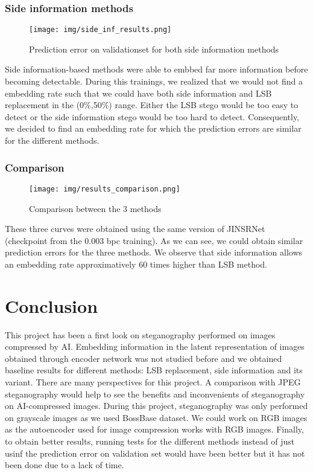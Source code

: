 \documentclass[12pt]{article}
\begin{document}
\subsubsection{Side information methods}
\begin{figure}[H]
    \texttt{[image: img/side\_inf\_results.png]}
    \caption[Side information methods results]{Prediction error on validationset for both side information methods}
    \label{fig:side_inf_results}
\end{figure}
Side information-based methods were able to embbed far more information before becoming detectable. During this trainings, we realized that we would not find a embedding rate such that we could have both side information and LSB replacement in the (0\%,50\%) range. Either the LSB stego would be too easy to detect or the side information stego would be too hard to detect. Consequently, we decided to find an embedding rate for which the prediction errors are similar for the different methods.

\subsubsection{Comparison}
\begin{figure}[H]
    \texttt{[image: img/results\_comparison.png]}
    \caption[Comparative results]{Comparison between the 3 methods}
    \label{fig:results_comparison}
\end{figure}
These three curves were obtained using the same version of JINSRNet (checkpoint from the 0.003 bpc training). As we can see, we could obtain similar prediction errors for the three methods. We observe that side information allows an embedding rate approximatively 60 times higher than LSB method.

\section{Conclusion}
This project has been a first look on steganography performed on images compressed by AI. Embedding information in the latent representation of images obtained through encoder network was not studied before and we obtained baseline results for different methods: LSB replacement, side information and its variant. There are many perspectives for this project. A comparison with JPEG steganography  would help to see the benefits and inconvenients of steganography on AI-compressed images. During this project, steganography was only performed on grayscale images as we used BossBase dataset. We could work on RGB images as the autoencoder used for image compression works with RGB images. Finally, to obtain better results, running tests for the different methods instead of just usinf the prediction error on validation set would have been better but it has not been done due to a lack of time.

\printbibliography
\end{document}

